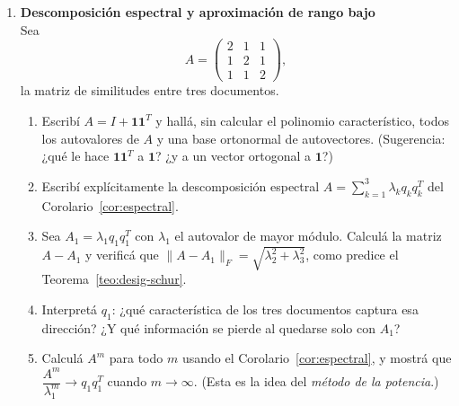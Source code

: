 \begin{enumerate}
\item {\bf Descomposición espectral y aproximación de rango bajo}   %
\\
Sea
\[
A=\begin{pmatrix}2&1&1\\1&2&1\\1&1&2\end{pmatrix},
\]
la matriz de similitudes entre tres documentos.
\begin{enumerate}[label=\alph*)]
    \item Escribí $A=I+\mathbf{1}\mathbf{1}^{T}$ y hallá, sin calcular el polinomio
          característico, todos los autovalores de $A$ y una base ortonormal de autovectores.
          (Sugerencia: ¿qué le hace $\mathbf{1}\mathbf{1}^{T}$ a $\mathbf 1$? ¿y a un
          vector ortogonal a $\mathbf 1$?)
    \item Escribí explícitamente la descomposición espectral
          $A=\sum_{k=1}^{3}\lambda_kq_kq_k^{T}$ del Corolario~\ref{cor:espectral}.
    \item Sea $A_1=\lambda_1q_1q_1^{T}$ con $\lambda_1$ el autovalor de mayor módulo.
          Calculá la matriz $A-A_1$ y verificá que
          $\|A-A_1\|_F=\sqrt{\lambda_2^{2}+\lambda_3^{2}}$, como predice el
          Teorema~\ref{teo:desig-schur}.
    \item Interpretá $q_1$: ¿qué característica de los tres documentos captura esa
          dirección? ¿Y qué información se pierde al quedarse solo con $A_1$?
    \item Calculá $A^{m}$ para todo $m$ usando el Corolario~\ref{cor:espectral}, y
          mostrá que $\dfrac{A^{m}}{\lambda_1^{m}}\longrightarrow q_1q_1^{T}$
          cuando $m\to\infty$. (Esta es la idea del \emph{método de la potencia}.)
\end{enumerate}


\end{enumerate}
